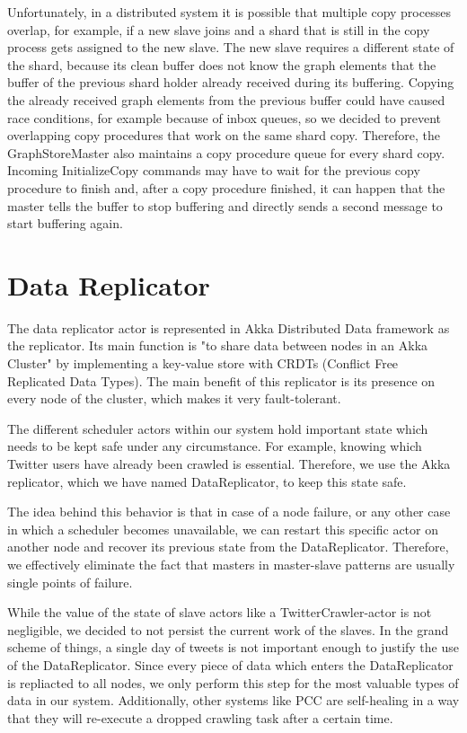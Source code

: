 \documentclass{sigchi}
\begin{document}
Unfortunately, in a distributed system it is possible that multiple copy processes overlap, for example, if a new slave joins and a shard that is still in the copy process gets assigned to the new slave. The new slave requires a different state of the shard, because its clean buffer does not know the graph elements that the buffer of the previous shard holder already received during its buffering. Copying the already received graph elements from the previous buffer could have caused race conditions, for example because of inbox queues, so we decided to prevent overlapping copy procedures that work on the same shard copy. Therefore, the GraphStoreMaster also maintains a copy procedure queue for every shard copy. Incoming InitializeCopy commands may have to wait for the previous copy procedure to finish and, after a copy procedure finished, it can happen that the master tells the buffer to stop buffering and directly sends a second message to start buffering again. 

\section{Data Replicator}
\label{sec:data_replicator}

The data replicator actor is represented in Akka Distributed Data framework as the replicator. Its main function is "to share data between nodes in an Akka Cluster" \cite{akka:dddoc} by implementing a key-value store with CRDTs (Conflict Free Replicated Data Types). The main benefit of this replicator is its presence on every node of the cluster, which makes it very fault-tolerant. 

The different scheduler actors within our system hold important state which needs to be kept safe under any circumstance. For example, knowing which Twitter users have already been crawled is essential. Therefore, we use the Akka replicator, which we have named DataReplicator, to keep this state safe.

The idea behind this behavior is that in case of a node failure, or any other case in which a scheduler becomes unavailable, we can restart this specific actor on another node and recover its previous state from the DataReplicator. Therefore, we effectively eliminate the fact that masters in master-slave patterns are usually single points of failure.

While the value of the state of slave actors like a TwitterCrawler-actor is not negligible, we decided to not persist the current work of the slaves. In the grand scheme of things, a single day of tweets is not important enough to justify the use of the DataReplicator. Since every piece of data which enters the DataReplicator is repliacted to all nodes, we only perform this step for the most valuable types of data in our system. Additionally, other systems like PCC are self-healing in a way that they will re-execute a dropped crawling task after a certain time.
\end{document}

